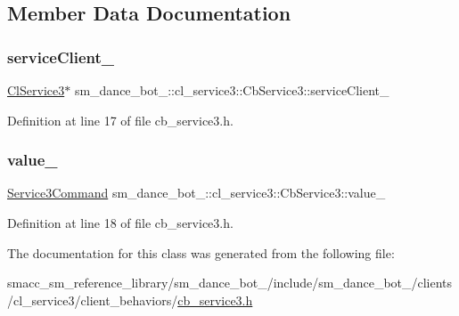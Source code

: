 \subsection{Member Data Documentation}
\mbox{\label{classsm__dance__bot__2_1_1cl__service3_1_1CbService3_ac5fafa2528bba4c7411816dde044c48a}} 
\subsubsection{\texorpdfstring{service\+Client\+\_\+}{serviceClient\_}}
{\footnotesize\ttfamily \hyperlink{classsm__dance__bot__2_1_1cl__service3_1_1ClService3}{Cl\+Service3}$\ast$ sm\+\_\+dance\+\_\+bot\+\_\+::cl\+\_\+service3\+::\+Cb\+Service3\+::service\+Client\+\_\+\hspace{0.3cm}{\ttfamily [private]}}



Definition at line 17 of file cb\+\_\+service3.\+h.

\mbox{\label{classsm__dance__bot__2_1_1cl__service3_1_1CbService3_ae48a64bc675b548fcb9c059831e39e37}} 
\subsubsection{\texorpdfstring{value\+\_\+}{value\_}}
{\footnotesize\ttfamily \hyperlink{namespacesm__dance__bot__2_1_1cl__service3_adfc3ce70a327b24b4fb6d6b02803caff}{Service3\+Command} sm\+\_\+dance\+\_\+bot\+\_\+::cl\+\_\+service3\+::\+Cb\+Service3\+::value\+\_\+\hspace{0.3cm}{\ttfamily [private]}}



Definition at line 18 of file cb\+\_\+service3.\+h.



The documentation for this class was generated from the following file\+:\begin{DoxyCompactItemize}
\item 
smacc\+\_\+sm\+\_\+reference\+\_\+library/sm\+\_\+dance\+\_\+bot\+\_/include/sm\+\_\+dance\+\_\+bot\+\_/clients/cl\+\_\+service3/client\+\_\+behaviors/\hyperlink{sm__dance__bot__2_2include_2sm__dance__bot__2_2clients_2cl__service3_2client__behaviors_2cb__service3_8h}{cb\+\_\+service3.\+h}\end{DoxyCompactItemize}
